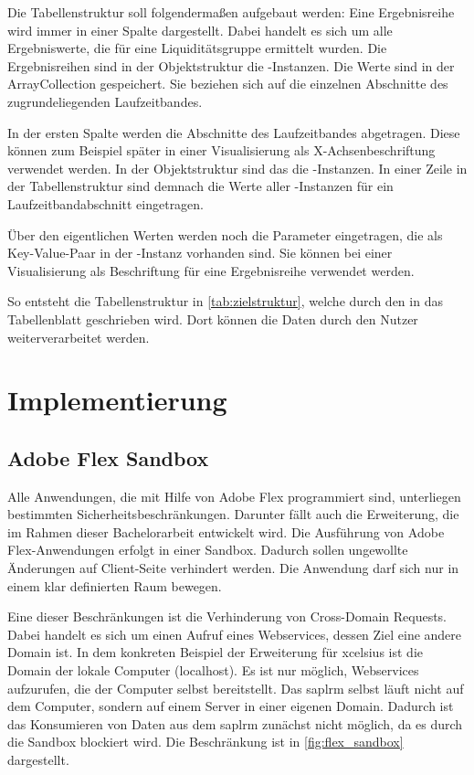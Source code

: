\begin{onehalfspacing}
Die Tabellenstruktur soll folgendermaßen aufgebaut werden: Eine Ergebnisreihe wird immer in einer Spalte dargestellt. Dabei handelt es sich um alle Ergebniswerte, die für eine Liquiditätsgruppe ermittelt wurden. Die Ergebnisreihen sind in der Objektstruktur die -Instanzen. Die Werte sind in der ArrayCollection  gespeichert. Sie beziehen sich auf die einzelnen Abschnitte des zugrundeliegenden Laufzeitbandes.

In der ersten Spalte werden die Abschnitte des Laufzeitbandes abgetragen. Diese können zum Beispiel später in einer Visualisierung als X-Achsenbeschriftung verwendet werden. In der Objektstruktur sind das die -Instanzen. In einer Zeile in der Tabellenstruktur sind demnach die Werte aller -Instanzen für ein Laufzeitbandabschnitt eingetragen.

Über den eigentlichen Werten werden noch die Parameter eingetragen, die als Key-Value-Paar in der -Instanz vorhanden sind. Sie können bei einer Visualisierung als Beschriftung für eine Ergebnisreihe verwendet werden.

So entsteht die Tabellenstruktur in \vref{tab:zielstruktur}, welche durch den  in das Tabellenblatt geschrieben wird. Dort können die Daten durch den Nutzer weiterverarbeitet werden.

\section{Implementierung}
\subsection{Adobe Flex Sandbox}
Alle Anwendungen, die mit Hilfe von Adobe Flex programmiert sind, unterliegen bestimmten Sicherheitsbeschränkungen. Darunter fällt auch die Erweiterung, die im Rahmen dieser Bachelorarbeit entwickelt wird. Die Ausführung von Adobe Flex-Anwendungen erfolgt in einer Sandbox. Dadurch sollen ungewollte Änderungen auf Client-Seite verhindert werden. Die Anwendung darf sich nur in einem klar definierten Raum bewegen.

Eine dieser Beschränkungen ist die Verhinderung von Cross-Domain Requests. Dabei handelt es sich um einen Aufruf eines Webservices, dessen Ziel eine andere Domain ist. In dem konkreten Beispiel der Erweiterung für \gls{xcelsius} ist die Domain der lokale Computer (localhost). Es ist nur möglich, Webservices aufzurufen, die der Computer selbst bereitstellt. Das \gls{saplrm} selbst läuft nicht auf dem Computer, sondern auf einem Server in einer eigenen Domain. Dadurch ist das Konsumieren von Daten aus dem \gls{saplrm} zunächst nicht möglich, da es durch die Sandbox blockiert wird. Die Beschränkung ist in \vref{fig:flex_sandbox} dargestellt.


\end{onehalfspacing}
